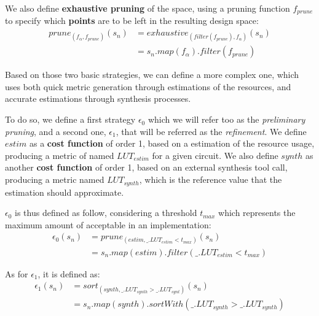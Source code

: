             We also define {\bf exhaustive pruning} of the space, using a pruning function $f_{prune}$ to specify which {\bf points} are to be left in the resulting design space:
            \begin{equation}
                \label{ch.dse:sec.functional:ssec.formalization:sssec.application:eq.prune}
                \begin{split}
                    prune_{(f_\alpha, f_{prune})}(s_n) &= exhaustive_{(filter(f_{prune}), f_\alpha)}(s_n)\\
                                                       &= s_n.map(f_\alpha).filter(f_{prune})
                \end{split}
            \end{equation}

            Based on those two basic strategies, we can define a more complex one, which uses both quick metric generation through  estimations of the resources, and accurate estimations through synthesis processes.

            To do so, we define a first strategy $\epsilon_0$ which we will refer too as the {\it preliminary pruning}, and a second one, $\epsilon_1$, that will be referred as the {\it refinement}.
            We define $estim$ as a {\bf cost function} of order 1, based on a  estimation of the  resource usage, producing a metric of named $LUT_{estim}$ for a given circuit.
            We also define $synth$ as another {\bf cost function} of order 1, based on an external synthesis tool call, producing a metric named $LUT_{synth}$, which is the reference value that the  estimation should approximate.
            
            $\epsilon_0$ is thus defined as follow, considering a threshold $t_{max}$ which represents the maximum amount of  acceptable in an implementation:
            \begin{equation}
                \begin{split}
                    \epsilon_0(s_n) & = prune_{(estim, \_.LUT_{estim} < t_{max})}(s_n) \\
                                    & = s_n.map(estim).filter(\_.LUT_{estim} < t_{max})
                \end{split}
            \end{equation}

            \noindent As for $\epsilon_1$, it is defined as:
            \begin{equation}
                \begin{split}
                    \epsilon_1(s_n) & = sort_{(synth, \_.LUT_{synth} > \_.LUT_{synt})}(s_n) \\
                                    & = s_n.map(synth).sortWith(\_.LUT_{synth} > \_.LUT_{synth})
                \end{split}
            \end{equation}
            
